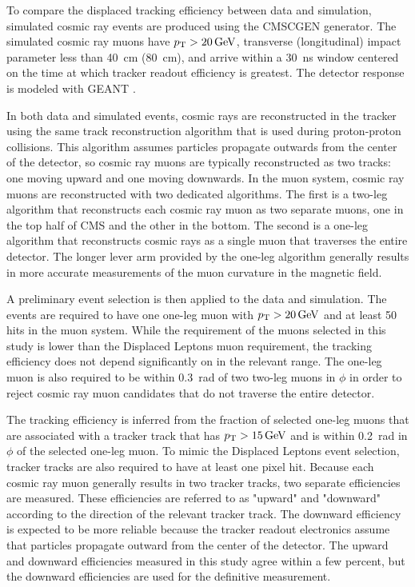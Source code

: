 To compare the displaced tracking efficiency between data and simulation, simulated cosmic ray events are produced using the CMSCGEN generator. The simulated cosmic ray muons have $\pt>\SI{20}{\GeV}$, transverse (longitudinal) impact parameter less than \SI{40}{\cm} (\SI{80}{\cm}), and arrive within a \SI{30}{\ns} window centered on the time at which tracker readout efficiency is greatest. The detector response is modeled with GEANT \cite{geant4}.

In both data and simulated events, cosmic rays are reconstructed in the tracker using the same track reconstruction algorithm that is used during proton-proton collisions. This algorithm assumes particles propagate outwards from the center of the detector, so cosmic ray muons are typically reconstructed as two tracks: one moving upward and one moving downwards. In the muon system, cosmic ray muons are reconstructed with two dedicated algorithms. The first is a two-leg algorithm that reconstructs each cosmic ray muon as two separate muons, one in the top half of CMS and the other in the bottom. The second is a one-leg algorithm that reconstructs cosmic rays as a single muon that traverses the entire detector. The longer lever arm provided by the one-leg algorithm generally results in more accurate measurements of the muon curvature in the magnetic field.

A preliminary event selection is then applied to the data and simulation. The events are required to have one one-leg muon with $\pt>\SI{20}{\GeV}$ and at least \num{50} hits in the muon system. While the \pt requirement of the muons selected in this study is lower than the Displaced Leptons muon \pt requirement, the tracking efficiency does not depend significantly on \pt in the relevant range. The one-leg muon is also required to be within \SI{0.3}{\radian} of two two-leg muons in $\phi$ in order to reject cosmic ray muon candidates that do not traverse the entire detector.

The tracking efficiency is inferred from the fraction of selected one-leg muons that are associated with a tracker track that has $\pt>\SI{15}{\GeV}$ and is within \SI{0.2}{\radian} in $\phi$ of the selected one-leg muon. To mimic the Displaced Leptons event selection, tracker tracks are also required to have at least one pixel hit. Because each cosmic ray muon generally results in two tracker tracks, two separate efficiencies are measured. These efficiencies are referred to as "upward" and "downward" according to the direction of the relevant tracker track. The downward efficiency is expected to be more reliable because the tracker readout electronics assume that particles propagate outward from the center of the detector. The upward and downward efficiencies measured in this study agree within a few percent, but the downward efficiencies are used for the definitive measurement.

